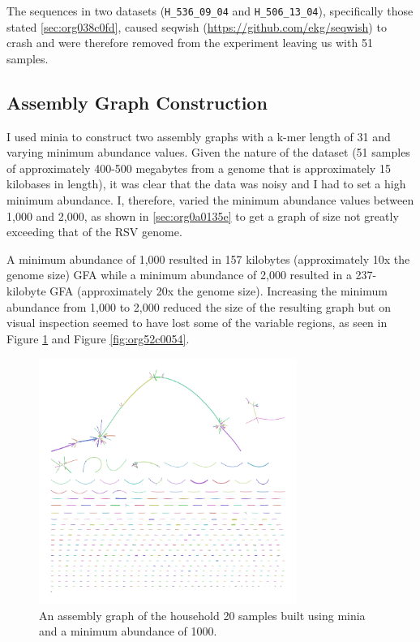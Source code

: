 \documentclass[10pt, a4paper]{article}
\begin{document}
The sequences in two datasets (\texttt{H\_536\_09\_04} and \texttt{H\_506\_13\_04}), specifically those
stated \ref{sec:org038c0fd}, caused seqwish
(\url{https://github.com/ekg/seqwish}) to crash and were therefore removed from the
experiment leaving us with 51 samples.

\subsection{Assembly Graph Construction}
\label{sec:org968dae7}
I used minia \cite{chikhiSpaceefficientExactBruijn2013} to construct two assembly
graphs with a k-mer
length of 31 and varying minimum abundance values. Given the nature of the
dataset (51 samples of approximately 400-500 megabytes from a genome that is
approximately 15 kilobases in length), it was clear that the data was noisy and
I had to set a high minimum abundance. I, therefore, varied the minimum
abundance values between 1,000 and 2,000, as shown in \ref{sec:org0a0135e}
to get a graph of size not greatly exceeding that of the RSV genome.

A minimum abundance of 1,000 resulted in 157 kilobytes
(approximately 10x the genome size) GFA while a minimum abundance of 2,000
resulted in a 237-kilobyte GFA (approximately 20x the genome size).
Increasing the minimum abundance from 1,000 to 2,000 reduced the size of the
resulting graph but on visual inspection seemed to have lost some of the
variable regions, as seen in Figure \ref{fig:org83b936e} and
Figure \ref{fig:org52c0054}.

\begin{figure}
\centering
\includegraphics[width=0.75\textwidth]{../Figures/RSV/Assembly_1000.png}
\caption[RSV Assembly Graph]{\label{fig:org83b936e}An assembly graph of the household 20 samples built using minia and a minimum abundance of 1000.}
\end{figure}
\end{document}
